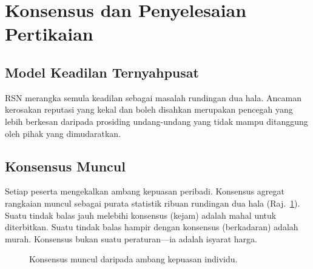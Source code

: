 \documentclass[11pt,a4paper,twocolumn]{article}
\begin{document}
\section{Konsensus dan Penyelesaian Pertikaian}

\subsection{Model Keadilan Ternyahpusat}

RSN merangka semula keadilan sebagai masalah rundingan dua hala. Ancaman kerosakan reputasi yang kekal dan boleh disahkan merupakan pencegah yang lebih berkesan daripada prosiding undang-undang yang tidak mampu ditanggung oleh pihak yang dimudaratkan.

\subsection{Konsensus Muncul}

Setiap peserta mengekalkan ambang kepuasan peribadi. Konsensus agregat rangkaian muncul sebagai purata statistik ribuan rundingan dua hala (Raj.~\ref{fig:consensus}). Suatu tindak balas jauh melebihi konsensus (kejam) adalah mahal untuk diterbitkan. Suatu tindak balas hampir dengan konsensus (berkadaran) adalah murah. Konsensus bukan suatu peraturan---ia adalah isyarat harga.

\begin{figure}[ht]
\centering
{}
\caption{Konsensus muncul daripada ambang kepuasan individu.}
\label{fig:consensus}
\end{figure}
\end{document}
